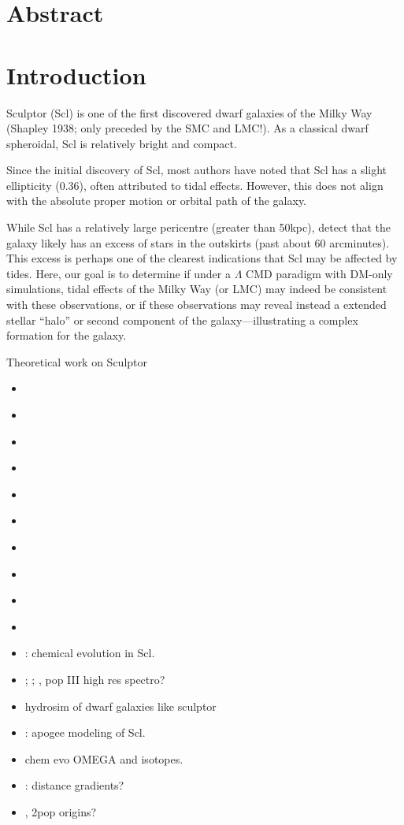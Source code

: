 \section{Abstract}\label{abstract}

\section{Introduction}\label{introduction}

Sculptor (Scl) is one of the first discovered dwarf galaxies of the
Milky Way (Shapley 1938; only preceded by the SMC and LMC!). As a
classical dwarf spheroidal, Scl is relatively bright and compact.

Since the initial discovery of Scl, most authors have noted that Scl has
a slight ellipticity (\(0.36\)), often attributed to tidal effects.
However, this does not align with the absolute proper motion or orbital
path of the galaxy.

While Scl has a relatively large pericentre (greater than 50kpc),
\citet{sestito+2023a} detect that the galaxy likely has an excess of
stars in the outskirts (past about 60 arcminutes). This excess is
perhaps one of the clearest indications that Scl may be affected by
tides. Here, our goal is to determine if under a \(\Lambda\) CMD
paradigm with DM-only simulations, tidal effects of the Milky Way (or
LMC) may indeed be consistent with these observations, or if these
observations may reveal instead a extended stellar ``halo'' or second
component of the galaxy---illustrating a complex formation for the
galaxy.

Theoretical work on Sculptor

\begin{itemize}
\tightlist
\item
  \citet{battaglia+2008}
\item
  \citet{iorio+2019}
\item
  \citet{amorisco+zavala+deboer2014}
\item
  \citet{battaglia+2008}
\item
  \citet{breddels+2013}
\item
  \citet{breddels+helmi2013}
\item
  \citet{richardson+fairbairn2014}
\item
  \citet{SFW2017}
\item
  \citet{innanen+papp1979}
\item
  \citet{wilkinson+2002}
\item
  \citet{yang+2025}: chemical evolution in Scl.
\item
  \citet{skuladottir+2024}; \citet{skuladottir+2021};
  \citet{lee+jeon+bromm2024}, pop III high res spectro?
\item
  \citet{wang+2024a} hydrosim of dwarf galaxies like sculptor
\item
  \citet{tang+2023}: apogee modeling of Scl.
\item
  \citet{pandey+west2022} chem evo OMEGA and isotopes.
\item
  \citet{an+koposov2022}: distance gradients?
\item
  \citet{kawata+2006}, 2pop origins?
\end{itemize}

